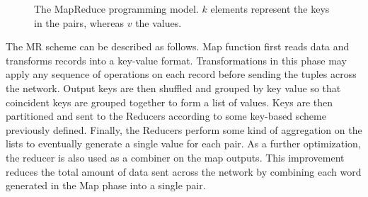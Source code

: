 \documentclass[3p,review]{elsarticle}
\begin{document}
\begin{figure}[!ht]
\centering {} \caption{The MapReduce programming model. $k$ elements represent the keys in the pairs, whereas $v$ the values.}
\label{fig:mapreduce}
\end{figure}

The MR scheme can be described as follows. Map function first reads data and transforms records into a key-value format. Transformations in this phase may apply any sequence of operations on each record before sending the tuples across the network. Output keys are then shuffled and grouped by key value so that coincident keys are grouped together to form a list of values. Keys are then partitioned and sent to the Reducers according to some key-based scheme previously defined. Finally, the Reducers perform some kind of aggregation on the lists to eventually generate a single value for each pair. As a further optimization, the reducer is also used as a combiner on the map outputs. This improvement reduces the total amount of data sent across the network by combining each word generated in the Map phase into a single pair.

\end{document}
